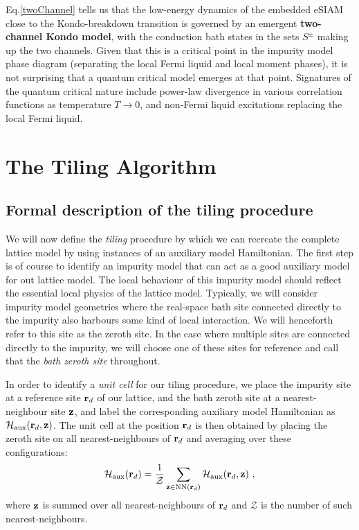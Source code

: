 \documentclass[reprint,hidelinks,onecolumn]{revtex4-2}
\begin{document}
Eq.\ref{twoChannel} tells us that the low-energy dynamics of the embedded eSIAM close to the Kondo-breakdown transition is governed by an emergent {\bf two-channel Kondo model}, with the conduction bath states in the sets \(S^\pm\) making up the two channels. Given that this is a critical point in the impurity model phase diagram (separating the local Fermi liquid and local moment phases), it is not surprising that a quantum critical model emerges at that point. Signatures of the quantum critical nature include power-law divergence in various correlation functions as temperature \(T \to 0\), and non-Fermi liquid excitations replacing the local Fermi liquid.

\section{The Tiling Algorithm}

\subsection{Formal description of the tiling procedure}
We will now define the {\it tiling} procedure by which we can recreate the complete lattice model by using instances of an auxiliary model Hamiltonian. The first step is of course to identify an impurity model that can act as a good auxiliary model for out lattice model. The local behaviour of this impurity model should reflect the essential local physics of the lattice model. Typically, we will consider impurity model geometries where the real-space bath site connected directly to the impurity also harbours some kind of local interaction. We will henceforth refer to this site as the zeroth site. In the case where multiple sites are connected directly to the impurity, we will choose one of these sites for reference and call that the {\it bath zeroth site} throughout.

In order to identify a {\it unit cell} for our tiling procedure, we place the impurity site at a reference site \({\bf r}_d\) of our lattice, and the bath zeroth site at a nearest-neighbour site \({\bf z}\), and label the corresponding auxiliary model Hamiltonian as \(\mathcal{H}_\text{aux}({\bf r}_d, {\bf z})\). The unit cell at the position \({\bf r}_d\) is then obtained by placing the zeroth site on all nearest-neighbours of \({\bf r}_d\) and averaging over these configurations:
\begin{equation}\begin{aligned}\label{unitCellHamiltonian}
	\mathcal{H}_\text{aux}({\bf r}_d) = \frac{1}{\mathcal{Z}}\sum_{{\bf z}\in\text{NN}({\bf r}_d)}\mathcal{H}_\text{aux}({\bf r}_d, {\bf z})~,
\end{aligned}\end{equation}
where \({\bf z}\) is summed over all nearest-neighbours of \({\bf r}_d\) and \(\mathcal{Z}\) is the number of such nearest-neighbours.
\end{document}
